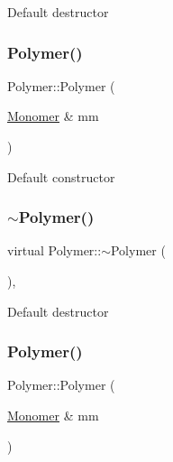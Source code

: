 Default destructor \mbox{\label{classPolymer_ae77454a3908652e4df6a26b9cac509a5}} 
\subsubsection{\texorpdfstring{Polymer()}{Polymer()}\hspace{0.1cm}{\footnotesize\ttfamily [4/14]}}
{\footnotesize\ttfamily Polymer\+::\+Polymer (\begin{DoxyParamCaption}\item[{\mbox{\hyperlink{classMonomer}{Monomer}} \&}]{mm }\end{DoxyParamCaption})\hspace{0.3cm}{\ttfamily [inline]}}

Default constructor \mbox{\label{classPolymer_aac2b3983f375a5691c7d5ca1a79594d5}} 
\subsubsection{\texorpdfstring{$\sim$\+Polymer()}{~Polymer()}\hspace{0.1cm}{\footnotesize\ttfamily [4/11]}}
{\footnotesize\ttfamily virtual Polymer\+::$\sim$\+Polymer (\begin{DoxyParamCaption}{ }\end{DoxyParamCaption})\hspace{0.3cm}{\ttfamily [inline]}, {\ttfamily [virtual]}}

Default destructor \mbox{\label{classPolymer_ae77454a3908652e4df6a26b9cac509a5}} 
\subsubsection{\texorpdfstring{Polymer()}{Polymer()}\hspace{0.1cm}{\footnotesize\ttfamily [5/14]}}
{\footnotesize\ttfamily Polymer\+::\+Polymer (\begin{DoxyParamCaption}\item[{\mbox{\hyperlink{classMonomer}{Monomer}} \&}]{mm }\end{DoxyParamCaption})\hspace{0.3cm}{\ttfamily [inline]}}

